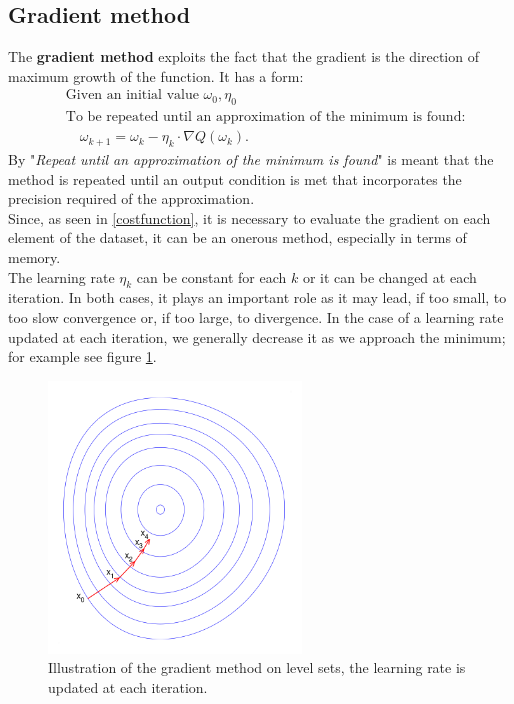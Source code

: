 \subsection{Gradient method \cite{ruder_2022}}
The \textbf{gradient method} exploits the fact that the gradient is the direction of maximum growth of the function. It has a form:
\begin{align*}
    &\text{Given an initial value }\omega_0, \eta_0\\
    &\text{To be repeated until an approximation of the minimum is found:}\\
    &\quad \omega_{k+1}=\omega_k - \eta_k\cdot \nabla Q(\omega_k).
\end{align*}
By "\textit{Repeat until an approximation of the minimum is found}" is meant that the method is repeated until an output condition is met that incorporates the precision required of the approximation.\\
Since, as seen in \ref{costfunction}, it is necessary to evaluate the gradient on each element of the dataset, it can be an onerous method, especially in terms of memory.\\
The learning rate $\eta_k$ can be constant for each $k$ or it can be changed at each iteration. In both cases, it plays an important role as it may lead, if too small, to too slow convergence or, if too large, to divergence. In the case of a learning rate updated at each iteration, we generally decrease it as we approach the minimum; for example see figure \ref{gradientDescentImage}.

\begin{figure}[h]
    \centering
    \includegraphics[width=0.6\textwidth]{images/Training (teoria)/Gradient descend.png}
    \caption{Illustration of the gradient method on level sets, the learning rate is updated at each iteration.\cite{wiki:gradientDescend}}
    \label{gradientDescentImage}
\end{figure}



